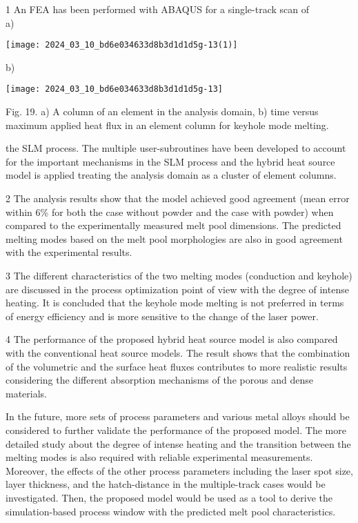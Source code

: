 \documentclass[10pt]{article}
\begin{document}
1 An FEA has been performed with ABAQUS for a single-track scan of\\
a)

\begin{center}
\texttt{[image: 2024\_03\_10\_bd6e034633d8b3d1d1d5g-13(1)]}
\end{center}

b)

\begin{center}
\texttt{[image: 2024\_03\_10\_bd6e034633d8b3d1d1d5g-13]}
\end{center}

Fig. 19. a) A column of an element in the analysis domain, b) time versus maximum applied heat flux in an element column for keyhole mode melting.

the SLM process. The multiple user-subroutines have been developed to account for the important mechanisms in the SLM process and the hybrid heat source model is applied treating the analysis domain as a cluster of element columns.

2 The analysis results show that the model achieved good agreement (mean error within 6\% for both the case without powder and the case with powder) when compared to the experimentally measured melt pool dimensions. The predicted melting modes based on the melt pool morphologies are also in good agreement with the experimental results.

3 The different characteristics of the two melting modes (conduction and keyhole) are discussed in the process optimization point of view with the degree of intense heating. It is concluded that the keyhole mode melting is not preferred in terms of energy efficiency and is more sensitive to the change of the laser power.

4 The performance of the proposed hybrid heat source model is also compared with the conventional heat source models. The result shows that the combination of the volumetric and the surface heat fluxes contributes to more realistic results considering the different absorption mechanisms of the porous and dense materials.

In the future, more sets of process parameters and various metal alloys should be considered to further validate the performance of the proposed model. The more detailed study about the degree of intense heating and the transition between the melting modes is also required with reliable experimental measurements. Moreover, the effects of the other process parameters including the laser spot size, layer thickness, and the hatch-distance in the multiple-track cases would be investigated. Then, the proposed model would be used as a tool to derive the simulation-based process window with the predicted melt pool characteristics.
\end{document}
